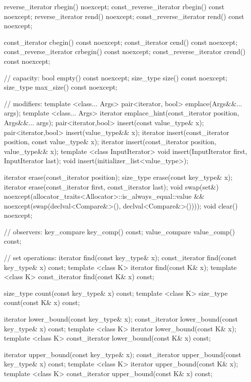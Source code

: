 \begin{codeblock}
{{    reverse_iterator       rbegin() noexcept;
    const_reverse_iterator rbegin() const noexcept;
    reverse_iterator       rend() noexcept;
    const_reverse_iterator rend() const noexcept;

    const_iterator         cbegin() const noexcept;
    const_iterator         cend() const noexcept;
    const_reverse_iterator crbegin() const noexcept;
    const_reverse_iterator crend() const noexcept;

    // capacity:
    bool      empty() const noexcept;
    size_type size() const noexcept;
    size_type max_size() const noexcept;

    // modifiers:
    template <class... Args> pair<iterator, bool> emplace(Args&&... args);
    template <class... Args> iterator emplace_hint(const_iterator position, Args&&... args);
    pair<iterator,bool> insert(const value_type& x);
    pair<iterator,bool> insert(value_type&& x);
    iterator insert(const_iterator position, const value_type& x);
    iterator insert(const_iterator position, value_type&& x);
    template <class InputIterator>
      void insert(InputIterator first, InputIterator last);
    void insert(initializer_list<value_type>);

    iterator  erase(const_iterator position);
    size_type erase(const key_type& x);
    iterator  erase(const_iterator first, const_iterator last);
    void      swap(set&)
      noexcept(allocator_traits<Allocator>::is_always_equal::value &&
               noexcept(swap(declval<Compare&>(), declval<Compare&>())));
    void      clear() noexcept;

    // observers:
    key_compare key_comp() const;
    value_compare value_comp() const;

    // set operations:
    iterator       find(const key_type& x);
    const_iterator find(const key_type& x) const;
    template <class K> iterator       find(const K& x);
    template <class K> const_iterator find(const K& x) const;

    size_type      count(const key_type& x) const;
    template <class K> size_type count(const K& x) const;

    iterator       lower_bound(const key_type& x);
    const_iterator lower_bound(const key_type& x) const;
    template <class K> iterator       lower_bound(const K& x);
    template <class K> const_iterator lower_bound(const K& x) const;

    iterator       upper_bound(const key_type& x);
    const_iterator upper_bound(const key_type& x) const;
    template <class K> iterator       upper_bound(const K& x);
    template <class K> const_iterator upper_bound(const K& x) const;

}}
\end{codeblock}
